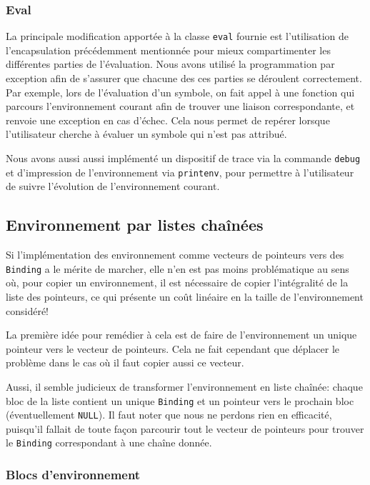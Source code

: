\documentclass[a4paper,11pt]{article}
\begin{document}
 \subsubsection{Eval}
 
 La principale modification apportée à la classe \texttt{eval} fournie est 
l'utilisation de l'encapsulation précédemment mentionnée pour mieux compartimenter 
les différentes parties de l'évaluation. Nous avons utilisé la programmation 
par exception afin de s'assurer que chacune des ces parties se déroulent 
correctement. Par exemple, lors de l'évaluation d'un symbole, on fait appel 
à une fonction qui parcours l'environnement courant afin de trouver une liaison 
correspondante, et renvoie une exception en cas d'échec. Cela nous permet de 
repérer lorsque l'utilisateur cherche à évaluer un symbole qui n'est pas attribué.

Nous avons aussi aussi implémenté un dispositif de trace via la commande 
\texttt{debug} et d'impression de l'environnement via \texttt{printenv}, 
pour permettre à l'utilisateur de suivre l'évolution de l'environnement courant.

\subsection{Environnement par listes chaînées}

Si l’implémentation des environnement comme vecteurs 
de pointeurs vers des \texttt{Binding} a le mérite de marcher, elle n'en est
pas moins problématique au sens où, pour copier un environnement, il est
nécessaire de copier l'intégralité de la liste des pointeurs, ce qui présente un
coût linéaire en la taille de l'environnement considéré!

La première idée pour remédier à cela est de faire de l'environnement un unique
pointeur vers le vecteur de pointeurs. Cela ne fait cependant que déplacer le
problème dans le cas où il faut copier aussi ce vecteur.

Aussi, il semble judicieux de transformer l’environnement en liste chaînée:
chaque bloc de la liste contient un unique \texttt{Binding} et un pointeur vers
le prochain bloc (éventuellement \texttt{NULL}). Il faut noter que nous ne perdons rien
en efficacité, puisqu'il fallait de toute façon parcourir tout le vecteur de
pointeurs pour trouver le \texttt{Binding} correspondant à une chaîne donnée.

\subsubsection{Blocs d’environnement}
\end{document}
